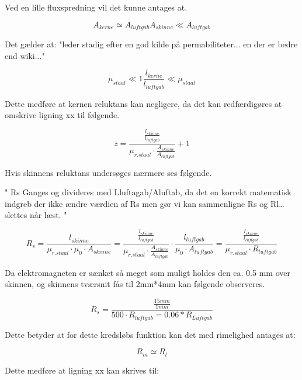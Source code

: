Ved en lille fluxspredning vil det kunne antages at.

\begin{equation}
A_{kerne} \simeq A_{luftgab}
A_{skinne} \ll A_{luftgab}
\end{equation}

Det gælder at: "leder stadig efter en god kilde på permabiliteter... en der er bedre end wiki..."

\begin{equation}
\mu_{staal} \ll 1
\frac{l_{kerne}}{l_{luftgab}}\ll \mu_{staal}
\end{equation}

Dette medføre at kernen reluktans kan negligere, da det kan redfærdigøres at omskrive ligning xx til følgende.

\begin{equation}
z =
\frac{
	\frac{l_{skinne}}{l_{luftgab}} }
{\mu_{r.staal} \cdot \frac{A_{skinne}}{A_{luftgab}} }
+ 1
\end{equation}

Hvis skinnens reluktans undersøges nærmere ses følgende.

" Rs Ganges og divideres med Lluftagab/Aluftab, da det en korrekt matematisk indgreb der ikke ændre værdien af Rs men gør vi kan sammenligne Rs og Rl… slettes når læst. "

\begin{equation}
R_s =  \frac{l_{skinne}}{\mu_{r.staal} \cdot \mu_0 \cdot A_{skinne} }
=
\frac{
	\frac{l_{skinne}}{l_{luftgab}} }
{\mu_{r.staal} \cdot \frac{A_{skinne}}{A_{luftgab}} }
\cdot \frac{l_{luftgab}}{\mu_0 \cdot A_{luftgab}}
=
\frac{
	\frac{l_{skinne}}{l_{luftgab}} }
	{\mu_{r.staal} \cdot R_{luftgab}}
\end{equation}


Da elektromagneten er sænket så meget som muligt holdes den ca. 0.5 mm over skinnen, og skinnens tværsnit fås til 2mm*4mm kan følgende observeres.

\begin{equation}
R_s =
\frac{
	\frac{15 mm}{1 mm} }
{ 500 \cdot R_{luftgab} = 0.06*R_{Luftgab}}
	\end{equation}

Dette betyder at for dette kredsløbs funktion kan det med rimelighed antages at:

\begin{equation}
R_m \simeq R_l
	\end{equation}

Dette medføre at ligning xx kan skrives til:

